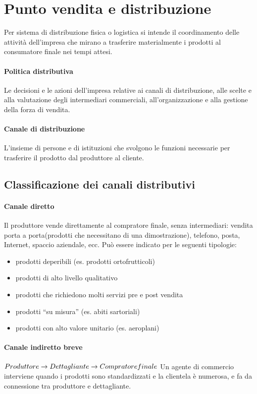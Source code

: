 \section{Punto vendita e distribuzione}
Per sistema di distribuzione fisica o logistica si intende il coordinamento delle attività dell’impresa che mirano a trasferire materialmente i prodotti al consumatore finale nei tempi attesi.
\paragraph{Politica distributiva} Le decisioni e le azioni dell’impresa relative ai canali di distribuzione, alle scelte e alla valutazione degli intermediari commerciali, all’organizzazione e alla gestione della forza di vendita.

\paragraph{Canale di distribuzione}
L’insieme di persone e di istituzioni che svolgono le funzioni necessarie per trasferire il prodotto
dal produttore al cliente.

\subsection{Classificazione dei canali distributivi}
\paragraph{Canale diretto}
Il produttore vende direttamente al compratore finale, senza intermediari: vendita porta a
porta(prodotti che necessitano di una dimostrazione), telefono, posta, Internet, spaccio aziendale, ecc. \newline
Può essere indicato per le seguenti tipologie:
\begin{itemize}
	\item prodotti deperibili (es. prodotti ortofrutticoli)
	\item prodotti di alto livello qualitativo
	\item prodotti che richiedono molti servizi pre e post vendita
	\item prodotti “su misura” (es. abiti sartoriali)
	\item prodotti con alto valore unitario (es. aeroplani)
\end{itemize}

\paragraph{Canale indiretto breve} 
$ \\ Produttore \rightarrow Dettagliante \rightarrow Compratore finale \\$
Un agente di commercio interviene quando i prodotti sono standardizzati e la clientela è numerosa, e fa da connessione tra produttore e dettagliante.

